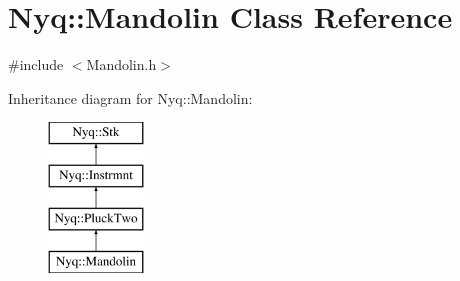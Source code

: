 \hypertarget{class_nyq_1_1_mandolin}{}\section{Nyq\+:\+:Mandolin Class Reference}
\label{class_nyq_1_1_mandolin}


{\ttfamily \#include $<$Mandolin.\+h$>$}

Inheritance diagram for Nyq\+:\+:Mandolin\+:\begin{figure}[H]
\begin{center}
\leavevmode
\includegraphics[height=4.000000cm]{class_nyq_1_1_mandolin}
\end{center}
\end{figure}
